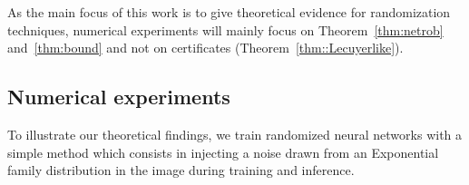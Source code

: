 As the main focus of this work is to give theoretical evidence for randomization techniques, numerical experiments will mainly focus on Theorem~\ref{thm:netrob} and~\ref{thm:bound} and not on certificates (Theorem~\ref{thm::Lecuyerlike}). %









\subsection{Numerical experiments}
\label{section::experiment}
To illustrate our theoretical findings, we train randomized neural networks with a simple method which consists in injecting a noise drawn from an Exponential family distribution in the image during training and inference. 
